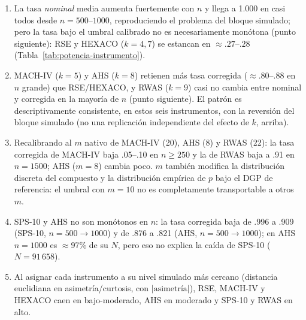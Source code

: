 \documentclass[man,mask,donotrepeattitle,floatsintext]{apa7}
\begin{document}
\begin{enumerate}
\item La tasa \emph{nominal} media aumenta fuertemente con $n$ y llega a 1.000 en casi todos desde $n=500$--$1000$, reproduciendo el problema del bloque simulado; pero la tasa bajo el umbral calibrado no es necesariamente monótona (punto siguiente): RSE y HEXACO ($k=4,7$) se estancan en $\approx.27$--$.28$ (Tabla~\ref{tab:potencia-instrumento}).
\item MACH-IV ($k=5$) y AHS ($k=8$) retienen más tasa corregida ($\approx.80$--$.88$ en $n$ grande) que RSE/HEXACO, y RWAS ($k=9$) casi no cambia entre nominal y corregida en la mayoría de $n$ (punto siguiente). El patrón es descriptivamente consistente, en estos seis instrumentos, con la reversión del bloque simulado (no una replicación independiente del efecto de $k$, arriba).
\item Recalibrando al $m$ nativo de MACH-IV (20), AHS (8) y RWAS (22): la tasa corregida de MACH-IV baja .05--.10 en $n\geq250$ y la de RWAS baja a .91 en $n=1500$; AHS ($m=8$) cambia poco. $m$ también modifica la distribución discreta del compuesto y la distribución empírica de $p$ bajo el DGP de referencia: el umbral con $m=10$ no es completamente transportable a otros $m$.
\item SPS-10 y AHS no son monótonos en $n$: la tasa corregida baja de .996 a .909 (SPS-10, $n=500\to1000$) y de .876 a .821 (AHS, $n=500\to1000$); en AHS $n=1000$ es $\approx$97\% de su $N$, pero eso no explica la caída de SPS-10 ($N=91\,658$).
\item Al asignar cada instrumento a su nivel simulado más cercano (distancia euclidiana en asimetría/curtosis, con $|\text{asimetría}|$), RSE, MACH-IV y HEXACO caen en bajo-moderado, AHS en moderado y SPS-10 y RWAS en alto.
\end{enumerate}
\end{document}
